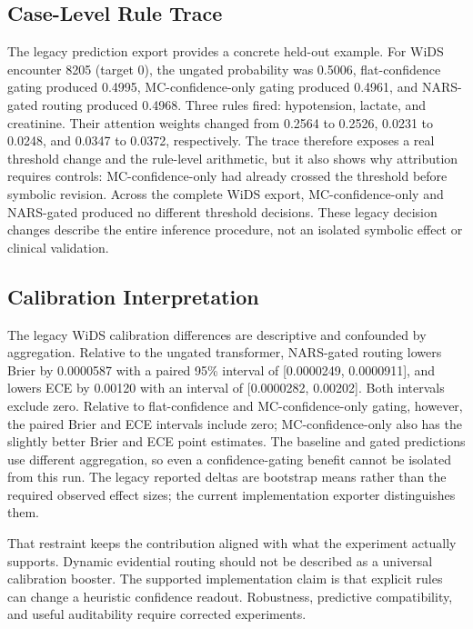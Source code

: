 \subsection{Case-Level Rule Trace}

The legacy prediction export provides a concrete held-out example. For WiDS encounter 8205 (target 0), the ungated probability was 0.5006, flat-confidence gating produced 0.4995, MC-confidence-only gating produced 0.4961, and NARS-gated routing produced 0.4968. Three rules fired: hypotension, lactate, and creatinine. Their attention weights changed from 0.2564 to 0.2526, 0.0231 to 0.0248, and 0.0347 to 0.0372, respectively. The trace therefore exposes a real threshold change and the rule-level arithmetic, but it also shows why attribution requires controls: MC-confidence-only had already crossed the threshold before symbolic revision. Across the complete WiDS export, MC-confidence-only and NARS-gated produced no different threshold decisions. These legacy decision changes describe the entire inference procedure, not an isolated symbolic effect or clinical validation.

\subsection{Calibration Interpretation}

The legacy WiDS calibration differences are descriptive and confounded by aggregation. Relative to the ungated transformer, NARS-gated routing lowers Brier by 0.0000587 with a paired 95\% interval of [0.0000249, 0.0000911], and lowers ECE by 0.00120 with an interval of [0.0000282, 0.00202]. Both intervals exclude zero. Relative to flat-confidence and MC-confidence-only gating, however, the paired Brier and ECE intervals include zero; MC-confidence-only also has the slightly better Brier and ECE point estimates. The baseline and gated predictions use different aggregation, so even a confidence-gating benefit cannot be isolated from this run. The legacy reported deltas are bootstrap means rather than the required observed effect sizes; the current implementation exporter distinguishes them.

That restraint keeps the contribution aligned with what the experiment actually supports. Dynamic evidential routing should not be described as a universal calibration booster. The supported implementation claim is that explicit rules can change a heuristic confidence readout. Robustness, predictive compatibility, and useful auditability require corrected experiments.

